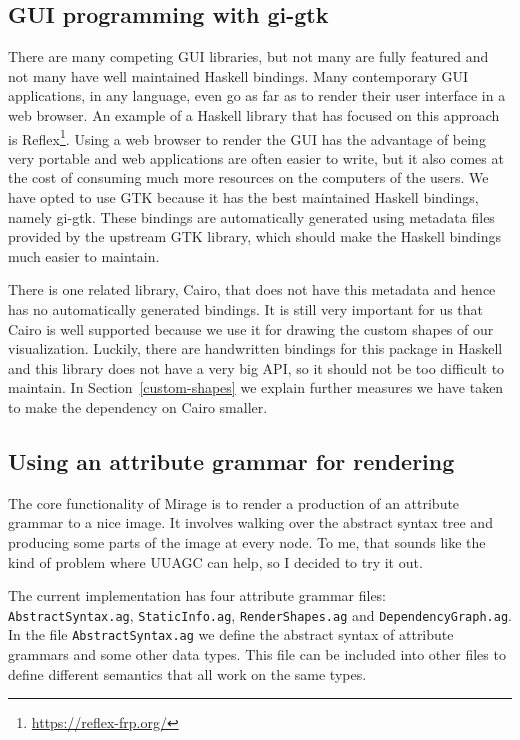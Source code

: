 \documentclass[11pt]{article}
\begin{document}
\subsection{GUI programming with gi-gtk}

There are many competing GUI libraries, but not many are fully featured and not many have well maintained Haskell bindings.
Many contemporary GUI applications, in any language, even go as far as to render their user interface in a web browser.
An example of a Haskell library that has focused on this approach is Reflex\footnote{\url{https://reflex-frp.org/}}.
Using a web browser to render the GUI has the advantage of being very portable and web applications are often easier to write, but it also comes at the cost of consuming much more resources on the computers of the users.
We have opted to use GTK because it has the best maintained Haskell bindings, namely gi-gtk.
These bindings are automatically generated using metadata files provided by the upstream GTK library, which should make the Haskell bindings much easier to maintain.

There is one related library, Cairo, that does not have this metadata and hence has no automatically generated bindings.
It is still very important for us that Cairo is well supported because we use it for drawing the custom shapes of our visualization.
Luckily, there are handwritten bindings for this package in Haskell and this library does not have a very big API, so it should not be too difficult to maintain. In Section~\ref{custom-shapes} we explain further measures we have taken to make the dependency on Cairo smaller.

\subsection{Using an attribute grammar for rendering}

The core functionality of Mirage is to render a production of an attribute grammar to a nice image.
It involves walking over the abstract syntax tree and producing some parts of the image at every node.
To me, that sounds like the kind of problem where UUAGC can help, so I decided to try it out.

The current implementation has four attribute grammar files: \texttt{AbstractSyntax.ag}, \texttt{StaticInfo.ag}, \texttt{RenderShapes.ag} and \texttt{DependencyGraph.ag}.
In the file \texttt{AbstractSyntax.ag} we define the abstract syntax of attribute grammars and some other data types. This file can be included into other files to define different semantics that all work on the same types.
\end{document}
